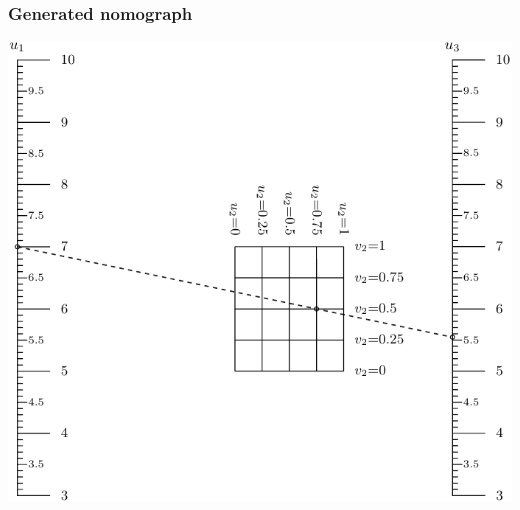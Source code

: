 \documentclass[a4paper,11pt,english]{sphinxmanual}
\begin{document}
\subsubsection{Generated nomograph}
\label{types/types:id61}
\includegraphics{ex_type9_nomo_1.pdf}
\end{document}

